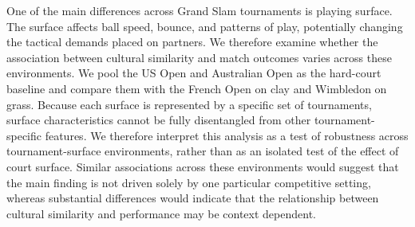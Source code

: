 \documentclass[10pt]{article}
\begin{document}

One of the main differences across Grand Slam tournaments is playing surface. The surface affects ball speed, bounce, and patterns of play, potentially changing the tactical demands placed on partners. We therefore examine whether the association between cultural similarity and match outcomes varies across these environments. We pool the US Open and Australian Open as the hard-court baseline and compare them with the French Open on clay and Wimbledon on grass. Because each surface is represented by a specific set of tournaments, surface characteristics cannot be fully disentangled from other tournament-specific features. We therefore interpret this analysis as a test of robustness across tournament-surface environments, rather than as an isolated test of the effect of court surface. Similar associations across these environments would suggest that the main finding is not driven solely by one particular competitive setting, whereas substantial differences would indicate that the relationship between cultural similarity and performance may be context dependent.
\end{document}

